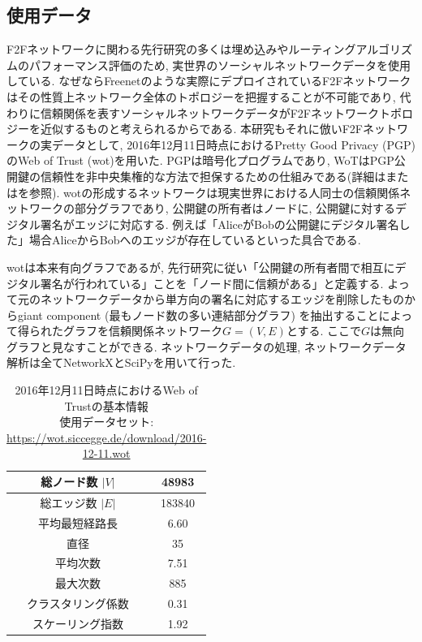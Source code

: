 \documentclass[dvipdfmx]{ampbt}
\begin{document}
  \subsection{使用データ} \label{sec:wot}
  F2Fネットワークに関わる先行研究の多くは埋め込みやルーティングアルゴリズムのパフォーマンス評価のため, 実世界のソーシャルネットワークデータを使用している. なぜならFreenetのような実際にデプロイされているF2Fネットワークはその性質上ネットワーク全体のトポロジーを把握することが不可能であり, 代わりに信頼関係を表すソーシャルネットワークデータがF2Fネットワークトポロジーを近似するものと考えられるからである. 本研究もそれに倣いF2Fネットワークの実データとして, 2016年12月11日時点におけるPretty Good Privacy (PGP)のWeb of Trust (\acrshort{wot})を用いた. PGPは暗号化プログラムであり, WoTはPGP公開鍵の信頼性を非中央集権的な方法で担保するための仕組みである(詳細は\cite{zimmermann1995official}または\cite{abdul1998distributed}を参照). \acrshort{wot}の形成するネットワークは現実世界における人同士の信頼関係ネットワークの部分グラフであり, 公開鍵の所有者はノードに, 公開鍵に対するデジタル署名がエッジに対応する. 例えば「AliceがBobの公開鍵にデジタル署名した」場合AliceからBobへのエッジが存在しているといった具合である.

  \acrshort{wot}は本来有向グラフであるが, 先行研究に従い「公開鍵の所有者間で相互にデジタル署名が行われている」ことを「ノード間に信頼がある」と定義する. よって元のネットワークデータから単方向の署名に対応するエッジを削除したものからgiant component (最もノード数の多い連結部分グラフ) を抽出することによって得られたグラフを信頼関係ネットワーク$G=(V,E)$とする. ここで$G$は無向グラフと見なすことができる. ネットワークデータの処理, ネットワークデータ解析は全てNetworkX\cite{hagberg2008exploring}とSciPy\cite{scipy2001}を用いて行った.
  \begin{table}[htbp]
   \begin{center}  
    \begin{tabular}{|c|c|} \hline
    総ノード数 $|V|$ & 48983 \\ \hline
    総エッジ数 $|E|$ & 183840 \\ \hline
    平均最短経路長 & 6.60 \\ \hline
    直径 & 35 \\ \hline
    平均次数 &  7.51 \\ \hline
    最大次数 & 885 \\ \hline
    クラスタリング係数 & 0.31\\ \hline
    スケーリング指数 & 1.92 \\ \hline
    \end{tabular}
   \end{center}
   \caption{2016年12月11日時点におけるWeb of Trustの基本情報 \\ 使用データセット: \url{https://wot.siccegge.de/download/2016-12-11.wot}}
   \label{table:wot_info}
  \end{table}
\end{document}
